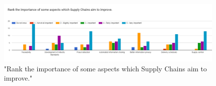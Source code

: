 
\begin{figure}[h]
\centering
\includegraphics[scale=0.35]{media/importance_SC_improvement_points.png}
\caption["Rank the importance of some aspects which Supply Chains aim to improve."]{"Rank the importance of some aspects which Supply Chains aim to improve."}
\label{fig:importance_SC_improvement_points}
\end{figure}



